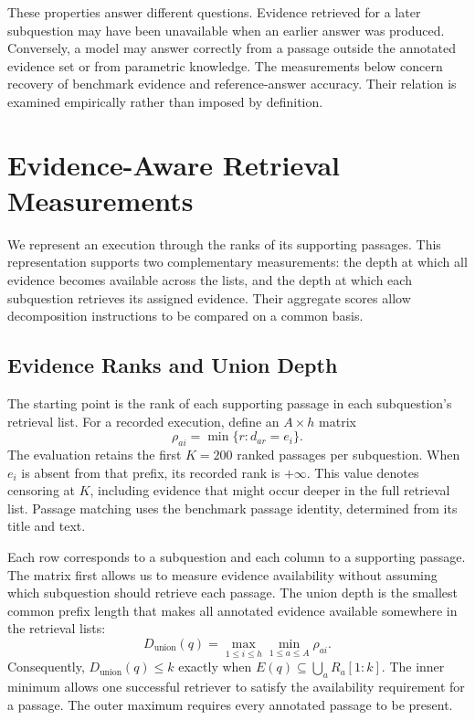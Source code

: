 These properties answer different questions. Evidence retrieved for a later
subquestion may have been unavailable when an earlier answer was produced.
Conversely, a model may answer correctly from a passage outside the annotated
evidence set or from parametric knowledge. The measurements below concern
recovery of benchmark evidence and reference-answer accuracy. Their relation is
examined empirically rather than imposed by definition.

\section{Evidence-Aware Retrieval Measurements}
\label{sec:ch4-depth}

We represent an execution through the ranks of its supporting passages.
This representation supports two complementary measurements: the depth at
which all evidence becomes available across the lists, and the depth at which
each subquestion retrieves its assigned evidence. Their aggregate scores
allow decomposition instructions to be compared on a common basis.

\subsection{Evidence Ranks and Union Depth}

The starting point is the rank of each supporting passage in each subquestion's
retrieval list. For a recorded execution, define an $A\times h$ matrix
\begin{equation}
  \rho_{ai}
  = \min\{r : d_{ar}=e_i\}.
  \label{eq:ch4-ranks}
\end{equation}
The evaluation retains the first $K=200$ ranked passages per subquestion.
When $e_i$ is absent from that prefix, its recorded rank is $+\infty$.
This value denotes censoring at $K$, including evidence that might occur deeper
in the full retrieval list. Passage matching uses the benchmark passage
identity, determined from its title and text.

Each row corresponds to a subquestion and each column to a supporting
passage. The matrix first allows us to measure evidence availability without
assuming which subquestion should retrieve each passage. The union depth is
the smallest common prefix length that makes all annotated evidence available
somewhere in the retrieval lists:
\begin{equation}
  D_{\mathrm{union}}(q)
  = \max_{1\leq i\leq h}\min_{1\leq a\leq A}\rho_{ai}.
  \label{eq:ch4-union}
\end{equation}
Consequently, $D_{\mathrm{union}}(q)\leq k$ exactly when
$E(q)\subseteq\bigcup_a R_a[1:k]$. The inner minimum allows one successful
retriever to satisfy the availability requirement for a passage. The outer
maximum requires every annotated passage to be present.

